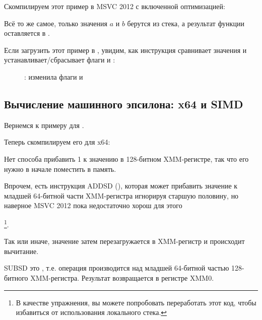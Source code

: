 Скомпилируем этот пример в MSVC 2012 с включенной оптимизацией:



Всё то же самое, только значения $a$ и $b$ 
берутся из стека, а результат функции оставляется в .

Если загрузить этот пример в \olly, 
увидим, как инструкция  сравнивает значения и устанавливает/сбрасывает
флаги \CF и \PF:

\begin{figure}[H]
\centering
{}
\caption{\olly:  изменила флаги \CF и \PF}
\label{fig:FPU_SIMD_d_max_olly}
\end{figure}

\subsection{Вычисление машинного эпсилона: x64 и SIMD}
\label{machine_epsilon_x64_and_SIMD}

Вернемся к примеру  для \Tdouble {}.

Теперь скомпилируем его для x64:



Нет способа прибавить 1 к значению в 128-битном XMM-регистре, так что его нужно в начале поместить в память.

Впрочем, есть инструкция ADDSD (),
которая может прибавить значение к младшей 64-битной части XMM-регистра игнорируя старшую половину,
но наверное MSVC 2012 пока недостаточно хорош для этого

\footnote{В качестве упражнения, вы можете попробовать переработать этот код, чтобы избавиться 
от использования локального стека.}.

Так или иначе, значение затем перезагружается в XMM-регистр и происходит вычитание.

SUBSD это , 
т.е. операция производится над младшей 64-битной частью 128-битного XMM-регистра.
Результат возвращается в регистре XMM0.



